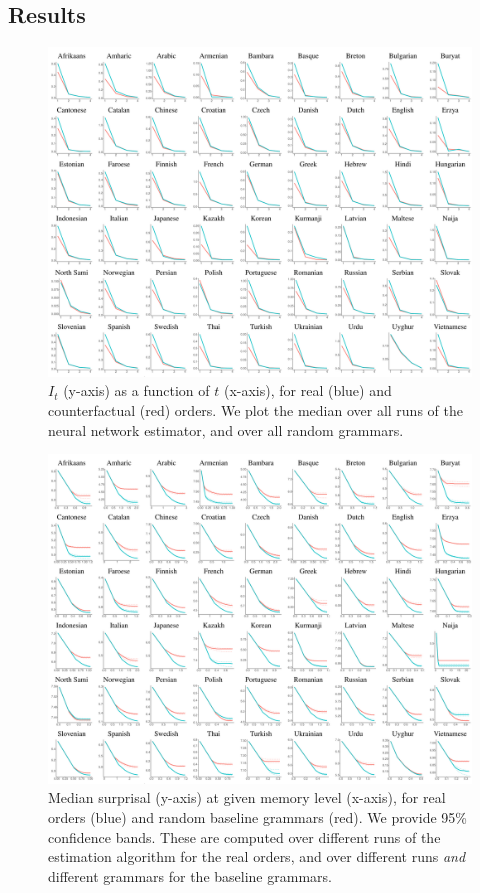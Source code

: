 \subsection{Results}

\begin{figure}
	\begin{center}
\includegraphics[width=\textwidth]{it-table.pdf}
\end{center}
	\caption{$I_t$ (y-axis) as a function of $t$ (x-axis), for real (blue) and counterfactual (red) orders. We plot the median over all runs of the neural network estimator, and over all random grammars.}\label{fig:it}
\end{figure}



\begin{figure}
	\begin{center}
\includegraphics[width=\textwidth]{results-table.pdf}
\end{center}
	\caption{Median surprisal (y-axis) at given memory level (x-axis), for real orders (blue) and random baseline grammars (red). We provide 95\% confidence bands. These are computed over different runs of the estimation algorithm for the real orders, and over different runs \emph{and} different grammars for the baseline grammars.}\label{fig:median-table}
\end{figure}


